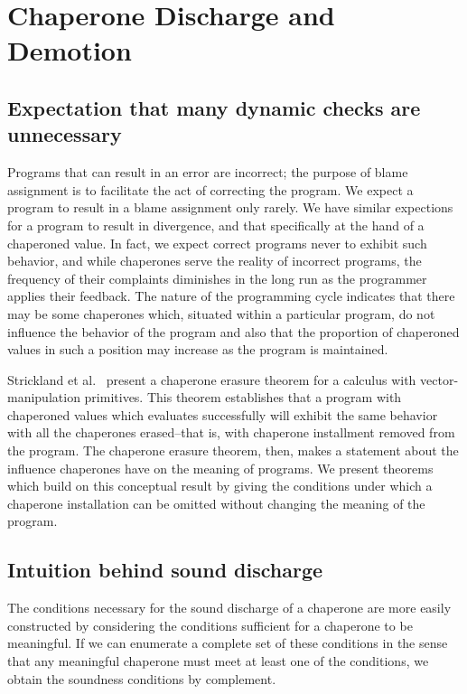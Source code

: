 \section{Chaperone Discharge and Demotion}

\subsection{Expectation that many dynamic checks are unnecessary}

Programs that can result in an error are incorrect; the purpose of blame assignment is to facilitate the act of correcting the program.
We expect a program to result in a blame assignment only rarely.
We have similar expections for a program to result in divergence, and that specifically at the hand of a chaperoned value.
In fact, we expect correct programs never to exhibit such behavior, and while chaperones serve the reality of incorrect programs, the frequency of their complaints diminishes in the long run as the programmer applies their feedback.
The nature of the programming cycle indicates that there may be some chaperones which, situated within a particular program, do not influence the behavior of the program and also that the proportion of chaperoned values in such a position may increase as the program is maintained.

Strickland et al.~\cite{strickland2012chaperones} present a chaperone erasure theorem for a calculus with vector-manipulation primitives.
This theorem establishes that a program with chaperoned values which evaluates successfully will exhibit the same behavior with all the chaperones erased--that is, with chaperone installment removed from the program.
The chaperone erasure theorem, then, makes a statement about the influence chaperones have on the meaning of programs.
We present theorems which build on this conceptual result by giving the conditions under which a chaperone installation can be omitted without changing the meaning of the program.

\subsection{Intuition behind sound discharge}

The conditions necessary for the sound discharge of a chaperone are more easily constructed by considering the conditions sufficient for a chaperone to be meaningful.
If we can enumerate a complete set of these conditions in the sense that any meaningful chaperone must meet at least one of the conditions, we obtain the soundness conditions by complement.

